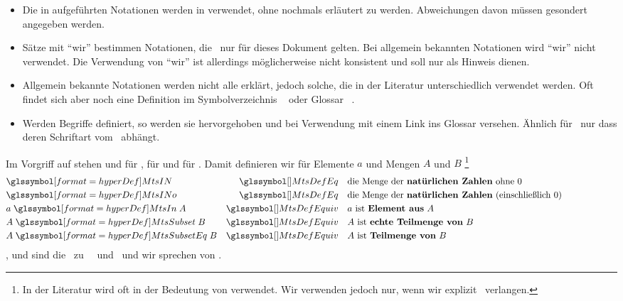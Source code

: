 \begin{itemize}
	\item Die in  aufgeführten Notationen werden in  verwendet, ohne nochmals erläutert zu werden. Abweichungen davon müssen gesondert angegeben werden.
	\item Sätze mit "`wir"' bestimmen Notationen, die \textevtl\ nur für dieses Dokument gelten.
	Bei allgemein bekannten Notationen wird "`wir"' nicht verwendet.
	Die Verwendung von "`wir"' ist allerdings möglicherweise nicht konsistent und soll nur als Hinweis dienen.
	\item Allgemein bekannte Notationen werden nicht alle erklärt, jedoch solche, die in der Literatur unterschiedlich verwendet werden.
	Oft findet sich aber noch eine Definition im Symbolverzeichnis \pagename~\pageref{dic-Symbolverzeichnis} oder Glossar \pagename~\pageref{dic-Glossar}.
	\item Werden Begriffe definiert, so werden sie \textcolor{blue}{} hervorgehoben und bei Verwendung mit einem Link ins Glossar versehen.
	Ähnlich für \Symbole\, nur dass deren Schriftart vom \Symbol\ abhängt.
\end{itemize}
%
Im Vorgriff auf  stehen  und  für ,  für  und  für .
Damit definieren wir für Elemente $a$ und Mengen $A$ und $B$%
\footnote{%
	In der Literatur wird \chrqt{\MtsSubset} oft in der Bedeutung von \chrqt{\MtsSubsetEq} verwendet.
	Wir verwenden \chrqt{\MtsSubset} jedoch nur, wenn wir explizit \Ungleichheit\ verlangen.
}
\begin{align}
	&   \defSym{\MtsIN}           & \MtsDefEq    \quad &
	\text{die Menge der \defFt{natürlichen Zahlen}  ohne           $0$}
	\label{def-MtsIN}   \\
	&   \defSym{\MtsINo}          & \MtsDefEq    \quad &
	\text{die Menge der \defFt{natürlichen Zahlen} (einschließlich $0$)}
	\label{def-MtsINo}  \\
	& a \defSymBin{\MtsIn}       A & \MtsDefEquiv \quad &
	\text{$a$ ist         \defFt{Element aus} $A$}
	\label{def-MtsIn} \\
	& A \defSymBin{\MtsSubset}   B & \MtsDefEquiv \quad &
	\text{$A$ ist \defFt{echte Teilmenge von} $B$}
	\label{def-MtsSub}   \\
	& A \defSymBin{\MtsSubsetEq} B & \MtsDefEquiv \quad &
	\text{$A$ ist  \defFt     {Teilmenge von} $B$}
	\label{def-MtsSubeq} \formulatoleft
\end{align}
,  und  sind die \Umkehrrelationen\ zu \MtsIn\, \MtsSubset\ und \MtsSubsetEq\ und wir sprechen von .

